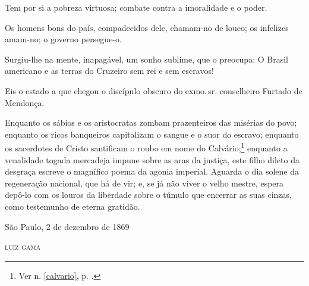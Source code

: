 Tem por si a pobreza virtuosa; combate contra a imoralidade e o poder.

Os homens bons do país, compadecidos dele, chamam-no de louco; os
infelizes amam-no; o governo persegue-o.

Surgiu-lhe na mente, inapagável, um sonho sublime, que o preocupa: O
Brasil americano e as terras do Cruzeiro sem rei e sem escravos!

Eis o estado a que chegou o discípulo obscuro do exmo.\,sr. conselheiro
Furtado de Mendonça.

Enquanto os sábios e os aristocratas zombam prazenteiros das misérias do
povo; enquanto os ricos banqueiros capitalizam o sangue e o suor do
escravo; enquanto os sacerdotes de Cristo santificam o roubo em nome do
Calvário;\footnote{Ver n. \ref{calvario}, p. \pageref{calvario}.} enquanto 
a venalidade togada mercadeja impune sobre as aras da justiça, este filho 
dileto da desgraça escreve o magnífico poema da agonia imperial. Aguarda 
o dia solene da regeneração nacional, que há de vir; e, se já não viver o 
velho mestre, espera depô-lo com os louros da liberdade sobre o túmulo que 
encerrar as suas cinzas, como testemunho de eterna gratidão.

\begin{flushright}
São Paulo, 2 de dezembro de 1869

\textsc{luiz gama}
\end{flushright}

